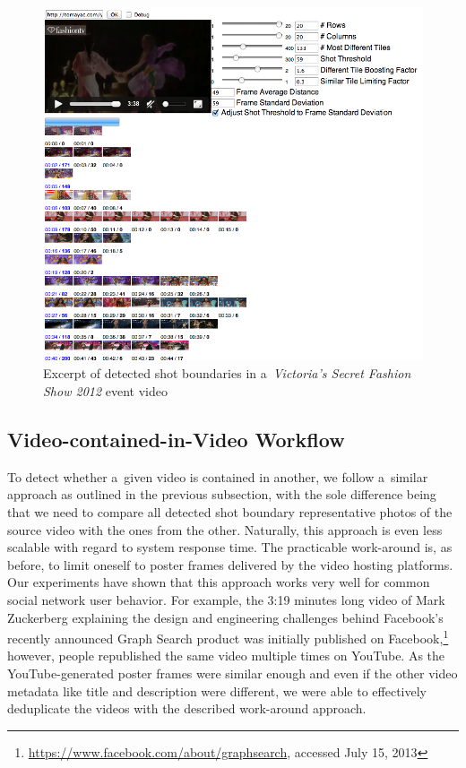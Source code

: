 \begin{figure}[!ht]
  \centering
  \includegraphics[width=1.0\linewidth]{./vsfashionshowboundaries.png}
  \caption[Excerpt of detected shot boundaries in an event video]
  {Excerpt of detected shot boundaries in a~\emph{Victoria's Secret Fashion Show 2012} event video}
  \label{fig:vsfashionshowboundaries}
\end{figure}

\subsection{Video-contained-in-Video Workflow}

To detect whether a~given video is contained in another,
we follow a~similar approach as outlined in the previous subsection,
with the sole difference being that we need to compare
all detected shot boundary representative photos of the source video
with the ones from the other.
Naturally, this approach is even less scalable
with regard to system response time.
The practicable work-around is, as before, to limit oneself
to poster frames delivered by the video hosting platforms.
Our experiments have shown that this approach works very well
for common social network user behavior.
For example, the 3:19 minutes long video of Mark Zuckerberg explaining
the design and engineering challenges behind Facebook's
recently announced Graph Search product was initially published
on Facebook,\footnote{\url{https://www.facebook.com/about/graphsearch},
accessed July 15, 2013} however, people republished the same video
multiple times on YouTube.
As the YouTube-generated poster frames were similar enough
and even if the other video metadata like title and description
were different, we were able to effectively deduplicate the videos
with the described work-around approach.

